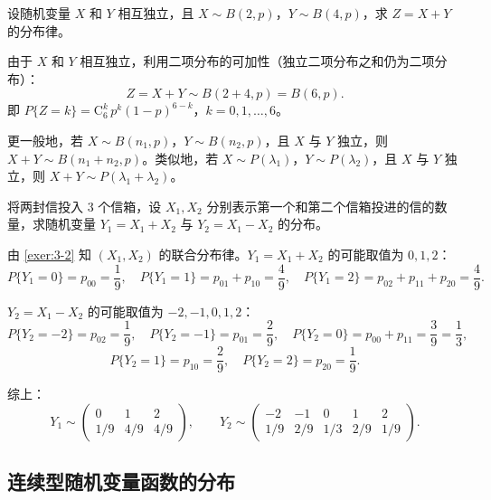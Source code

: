 ﻿\documentclass[lang=cn,11pt]{elegantbook}
\begin{document}
\begin{exercise}\label{exer:3-6}
设随机变量 $X$ 和 $Y$ 相互独立，且 $X \sim B(2, p)$，$Y \sim B(4, p)$，求 $Z = X + Y$ 的分布律。
\end{exercise}

\begin{solution}
由于 $X$ 和 $Y$ 相互独立，利用二项分布的可加性（独立二项分布之和仍为二项分布）：
\[
Z = X + Y \sim B(2+4, p) = B(6, p).
\]
即 $P\{Z = k\} = \mathrm{C}_6^k\,p^k(1-p)^{6-k}$，$k = 0, 1, \dots, 6$。

\begin{note}
更一般地，若 $X \sim B(n_1, p)$，$Y \sim B(n_2, p)$，且 $X$ 与 $Y$ 独立，则 $X + Y \sim B(n_1 + n_2, p)$。类似地，若 $X \sim P(\lambda_1)$，$Y \sim P(\lambda_2)$，且 $X$ 与 $Y$ 独立，则 $X + Y \sim P(\lambda_1 + \lambda_2)$。
\end{note}
\end{solution}

\begin{exercise}[和与差的分布] \label{exer:3-6b}
将两封信投入 3 个信箱，设 $X_1, X_2$ 分别表示第一个和第二个信箱投进的信的数量，求随机变量 $Y_1 = X_1 + X_2$ 与 $Y_2 = X_1 - X_2$ 的分布。
\end{exercise}

\begin{solution}
由 \ref{exer:3-2} 知 $(X_1, X_2)$ 的联合分布律。$Y_1 = X_1 + X_2$ 的可能取值为 $0, 1, 2$：
\[
P\{Y_1 = 0\} = p_{00} = \frac{1}{9}, \quad P\{Y_1 = 1\} = p_{01} + p_{10} = \frac{4}{9}, \quad P\{Y_1 = 2\} = p_{02} + p_{11} + p_{20} = \frac{4}{9}.
\]

$Y_2 = X_1 - X_2$ 的可能取值为 $-2, -1, 0, 1, 2$：
\[
P\{Y_2 = -2\} = p_{02} = \frac{1}{9}, \quad P\{Y_2 = -1\} = p_{01} = \frac{2}{9}, \quad P\{Y_2 = 0\} = p_{00} + p_{11} = \frac{3}{9} = \frac{1}{3},
\]
\[
P\{Y_2 = 1\} = p_{10} = \frac{2}{9}, \quad P\{Y_2 = 2\} = p_{20} = \frac{1}{9}.
\]

综上：
\[
Y_1 \sim \begin{pmatrix} 0 & 1 & 2 \\ 1/9 & 4/9 & 4/9 \end{pmatrix}, \qquad Y_2 \sim \begin{pmatrix} -2 & -1 & 0 & 1 & 2 \\ 1/9 & 2/9 & 1/3 & 2/9 & 1/9 \end{pmatrix}.
\]
\end{solution}

\subsection{连续型随机变量函数的分布}
\end{document}
